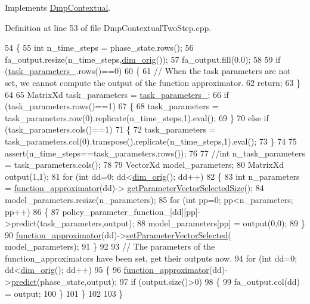 Implements \hyperlink{classDmpBbo_1_1DmpContextual_a768d6c4c35c804556afba0930cb25936}{Dmp\+Contextual}.



Definition at line 53 of file Dmp\+Contextual\+Two\+Step.\+cpp.


\begin{DoxyCode}
54 \{
55   \textcolor{keywordtype}{int} n\_time\_steps = phase\_state.rows(); 
56   fa\_output.resize(n\_time\_steps,\hyperlink{group__DynamicalSystems_ga93d7cbbf2e471b00f124e41706405a05}{dim\_orig}());
57   fa\_output.fill(0.0);
58   
59   \textcolor{keywordflow}{if} (\hyperlink{classDmpBbo_1_1DmpContextual_af0d2e6fef248e131b92fc244b55b50c6}{task\_parameters\_}.rows()==0)
60   \{
61     \textcolor{comment}{// When the task parameters are not set, we cannot compute the output of the function approximator.}
62     \textcolor{keywordflow}{return};
63   \}
64   
65   MatrixXd task\_parameters = \hyperlink{classDmpBbo_1_1DmpContextual_af0d2e6fef248e131b92fc244b55b50c6}{task\_parameters\_};
66   \textcolor{keywordflow}{if} (task\_parameters.rows()==1)
67   \{ 
68     task\_parameters = task\_parameters.row(0).replicate(n\_time\_steps,1).eval();
69   \}
70   \textcolor{keywordflow}{else} \textcolor{keywordflow}{if} (task\_parameters.cols()==1)
71   \{
72     task\_parameters = task\_parameters.col(0).transpose().replicate(n\_time\_steps,1).eval();
73   \}
74 
75   assert(n\_time\_steps==task\_parameters.rows());
76   
77   \textcolor{comment}{//int n\_task\_parameters = task\_parameters.cols();}
78   
79   VectorXd model\_parameters;
80   MatrixXd output(1,1);
81   \textcolor{keywordflow}{for} (\textcolor{keywordtype}{int} dd=0; dd<\hyperlink{group__DynamicalSystems_ga93d7cbbf2e471b00f124e41706405a05}{dim\_orig}(); dd++)
82   \{ 
83     \textcolor{keywordtype}{int} n\_parameters = \hyperlink{classDmpBbo_1_1Dmp_ac428e2dd848c99ddaf517f2dbacdf3ad}{function\_approximator}(dd)->
      \hyperlink{classDmpBbo_1_1FunctionApproximator_ae83cb950bcf5219841e6ca8511ac2907}{getParameterVectorSelectedSize}();
84     model\_parameters.resize(n\_parameters);
85     \textcolor{keywordflow}{for} (\textcolor{keywordtype}{int} pp=0; pp<n\_parameters; pp++)
86     \{
87       policy\_parameter\_function\_[dd][pp]->predict(task\_parameters,output);
88       model\_parameters[pp] = output(0,0);
89     \}
90     \hyperlink{classDmpBbo_1_1Dmp_ac428e2dd848c99ddaf517f2dbacdf3ad}{function\_approximator}(dd)->\hyperlink{classDmpBbo_1_1FunctionApproximator_aee501e63a46d63eb58a6f271bf093b9d}{setParameterVectorSelected}(
      model\_parameters);
91   \}
92 
93   \textcolor{comment}{// The parameters of the function\_approximators have been set, get their outputs now.  }
94   \textcolor{keywordflow}{for} (\textcolor{keywordtype}{int} dd=0; dd<\hyperlink{group__DynamicalSystems_ga93d7cbbf2e471b00f124e41706405a05}{dim\_orig}(); dd++)
95   \{
96     \hyperlink{classDmpBbo_1_1Dmp_ac428e2dd848c99ddaf517f2dbacdf3ad}{function\_approximator}(dd)->\hyperlink{classDmpBbo_1_1FunctionApproximator_a0547681a81d4c43ce2601f16047baf7a}{predict}(phase\_state,output);
97     \textcolor{keywordflow}{if} (output.size()>0)
98     \{
99       fa\_output.col(dd) = output;
100     \}
101   \}
102 
103 \}
\end{DoxyCode}


